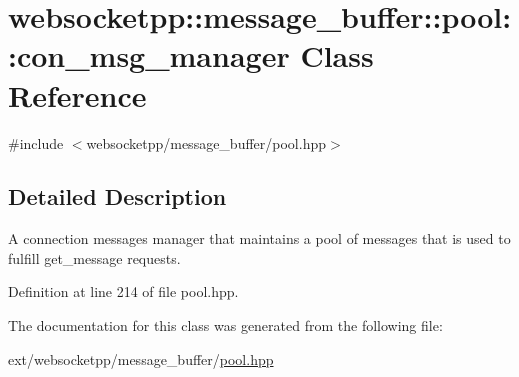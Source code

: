 \hypertarget{classwebsocketpp_1_1message__buffer_1_1pool_1_1con__msg__manager}{}\section{websocketpp\+:\+:message\+\_\+buffer\+:\+:pool\+:\+:con\+\_\+msg\+\_\+manager Class Reference}
\label{classwebsocketpp_1_1message__buffer_1_1pool_1_1con__msg__manager}


{\ttfamily \#include $<$websocketpp/message\+\_\+buffer/pool.\+hpp$>$}



\subsection{Detailed Description}
A connection messages manager that maintains a pool of messages that is used to fulfill get\+\_\+message requests. 

Definition at line 214 of file pool.\+hpp.



The documentation for this class was generated from the following file\+:\begin{DoxyCompactItemize}
\item 
ext/websocketpp/message\+\_\+buffer/\hyperlink{pool_8hpp}{pool.\+hpp}\end{DoxyCompactItemize}
